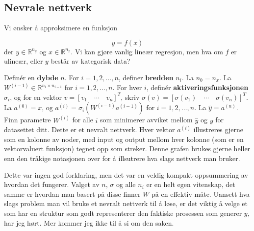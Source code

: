 \subsection{Nevrale nettverk}
Vi ønsker å approksimere en funksjon

\begin{equation}
	y = f(x)
\end{equation}
der $y \in \mathbb{R}^{n_y}$ og $x \in \mathbb{R}^{n_x}$. Vi kan gjøre vanlig lineær regresjon, men hva om $f$ er ulineær, eller $y$ består av kategorisk data?

Definér en \textbf{dybde} $n$. For $i = 1, 2, \dots, n$, definer \textbf{bredden} $n_i$. La $n_0 = n_x$. La $W^{(i-1)} \in \mathbb{R}^{n_i \times n_{i-1}}$ for $i = 1, 2, \dots, n$. For hver $i$, definér \textbf{aktiveringsfunksjonen} $\sigma_i$, og for en vektor $v = [v_1 \quad \cdots \quad v_n]^T$, skriv $\sigma(v) = [\sigma(v_1) \quad \cdots \quad \sigma(v_n)]^T$. La $a^{(0)} = x$, og $a^{(i)} = \sigma_i( W^{(i-1)} a^{(i-1)} )$ for $i = 1, 2, \dots, n$. La $\hat{y} = a^{(n)}$. Finn parametre $W^{(i)}$ for alle $i$ som minimerer avviket mellom $\hat{y}$ og $y$ for datasettet ditt. Dette er et nevralt nettverk. Hver vektor $a^{(i)}$ illustreres gjerne som en kolonne av noder, med input og output mellom hver kolonne (som er en vektorvaluert funksjon) tegnet opp som streker. Denne grafen brukes gjerne heller enn den tråkige notasjonen over for å illsutrere hva slags nettverk man bruker.

Dette var ingen god forklaring, men det var en veldig kompakt oppsummering av hvordan det fungerer. Valget av $n$, $\sigma$ og alle $n_i$ er en helt egen vitenskap, det samme er hvordan man basert på disse finner $W$ på en effektiv måte. Uansett hva slags problem man vil bruke et nevralt nettverk til å løse, er det viktig å velge et som har en struktur som godt representerer den faktiske prosessen som generer $y$, har jeg hørt. Mer kommer jeg ikke til å si om den saken.
